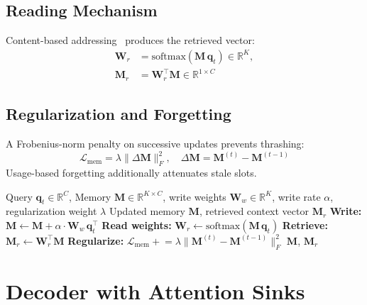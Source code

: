 \subsection{Reading Mechanism}
Content-based addressing~\cite{graves2016dnc} produces the retrieved vector:
\begin{align}
    \mathbf{W}_r &= \mathrm{softmax}(\mathbf{M} \, \mathbf{q}_t) \in \mathbb{R}^K, \\
    \mathbf{M}_r &= \mathbf{W}_r^\top \mathbf{M} \in \mathbb{R}^{1 \times C}
    \label{eq:bitmar_mem_read}
\end{align}

\subsection{Regularization and Forgetting}
A Frobenius-norm penalty on successive updates prevents thrashing:
\begin{equation}
    \mathcal{L}_{\text{mem}} = \lambda \|\Delta\mathbf{M}\|_F^2, \quad \Delta\mathbf{M} = \mathbf{M}^{(t)} - \mathbf{M}^{(t-1)}
    \label{eq:bitmar_mem_reg}
\end{equation}
Usage-based forgetting additionally attenuates stale slots.

\begin{algorithm}[htbp]
\small
\caption{BitMar episodic memory read/write procedure.}
\label{alg:bitmar_memory}
\begin{algorithmic}[1]
\Require Query $\mathbf{q}_t \in \mathbb{R}^C$, Memory $\mathbf{M} \in \mathbb{R}^{K \times C}$,
\Statex \hspace{\algorithmicindent} write weights $\mathbf{W}_w \in \mathbb{R}^K$, write rate $\alpha$, regularization weight $\lambda$
\Ensure Updated memory $\mathbf{M}$, retrieved context vector $\mathbf{M}_r$
\State \textbf{Write:} $\mathbf{M} \leftarrow \mathbf{M} + \alpha \cdot \mathbf{W}_w \, \mathbf{q}_t^\top$
\State \textbf{Read weights:} $\mathbf{W}_r \leftarrow \mathrm{softmax}(\mathbf{M} \, \mathbf{q}_t)$
\State \textbf{Retrieve:} $\mathbf{M}_r \leftarrow \mathbf{W}_r^\top \mathbf{M}$
\State \textbf{Regularize:} $\mathcal{L}_{\text{mem}} \mathrel{+}= \lambda\|\mathbf{M}^{(t)} - \mathbf{M}^{(t-1)}\|_F^2$
\State \Return $\mathbf{M}$, $\mathbf{M}_r$
\end{algorithmic}
\end{algorithm}

\section{Decoder with Attention Sinks}
\label{sec:bitmar_decoder}

